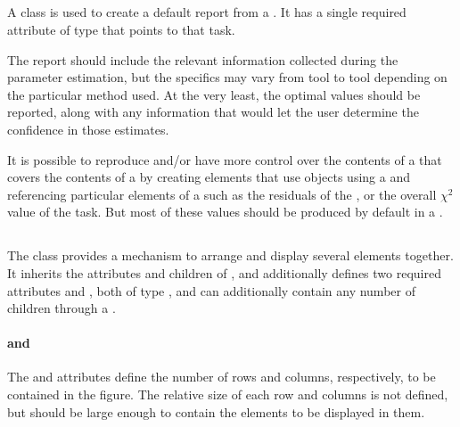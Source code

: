 \begin{blockChanged}
\subsection{}
\label{class:parameterEstimationReport}
A \ParameterEstimationReport class is used to create a default report from a \ParameterEstimationTask.  It has a single required attribute  of type \SIdRef that points to that task.


The report should include the relevant information collected during the parameter estimation, but the specifics may vary from tool to tool depending on the particular method used.  At the very least, the optimal \AdjustableParameter values should be reported, along with any information that would let the user determine the confidence in those estimates.

It is possible to reproduce and/or have more control over the contents of a \Report that covers the contents of a \ParameterEstimationTask by creating \DataGenerator elements that use \Variable objects using a  and referencing particular elements of a \ParameterEstimationTask such as the residuals of the \Objective, or the overall $\chi^2$ value of the task.  But most of these values should be produced by default in a \ParameterEstimationReport.


\subsection{}
\label{class:figure}
\label{class:listOfSubPlots}

The \Figure class provides a mechanism to arrange and display several \Plot elements together.  It inherits the attributes and children of \Output, and additionally defines two required attributes  and , both of type , and can additionally contain any number of \SubPlot children through a \ListOfSubPlots.


\paragraph*{ and }
The  and  attributes define the number of rows and columns, respectively, to be contained in the figure.  The relative size of each row and columns is not defined, but should be large enough to contain the \Plot elements to be displayed in them.


\end{blockChanged}
